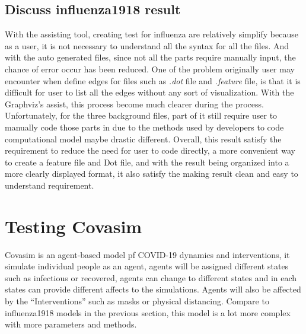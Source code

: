 \subsection{Discuss influenza1918 result}
With the assisting tool, creating test for influenza are relatively simplify because as a user, it is not necessary to understand all the syntax for all the files. And with the auto generated files, since not all the parts require manually input, the chance of error occur has been reduced. One of the problem originally user may encounter when define edges for files such as \textsl{.dot} file and \textsl{.feature} file, is that it is difficult for user to list all the edges without any sort of visualization. With the Graphviz’s assist, this process become much clearer during the process. Unfortunately, for the three background files, part of it still require user to manually code those parts in due to the methods used by developers to code computational model maybe drastic different. Overall, this result satisfy the requirement to reduce the need for user to code directly, a more convenient way to create a feature file and Dot file, and with the result being organized into a more clearly displayed format, it also satisfy the making result clean and easy to understand requirement.
\section{Testing Covasim}
Covasim is an agent-based model pf COVID-19 dynamics and interventions, it simulate individual people as an agent, agents will be assigned different states such as infectious or recovered, agents can change to different states and in each states can provide different affects to the simulations. Agents will also be affected by the “Interventions” such as masks or physical distancing. Compare to influenza1918 models in the previous section, this model is a lot more complex with more parameters and methods. 
